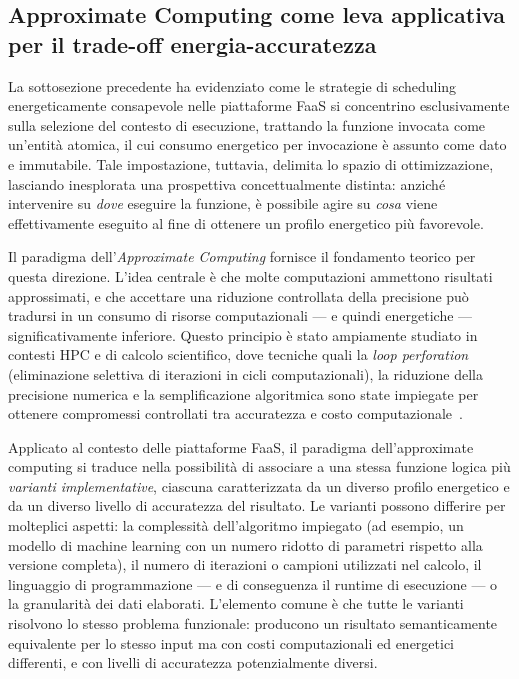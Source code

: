 \subsection{Approximate Computing come leva applicativa per il trade-off energia-accuratezza}
\label{subsec:approximate_computing}

La sottosezione precedente ha evidenziato come le strategie di scheduling 
energeticamente consapevole nelle piattaforme FaaS si concentrino 
esclusivamente sulla selezione del contesto di esecuzione, 
trattando la funzione invocata come un’entità atomica,
il cui consumo energetico per invocazione è assunto come dato e 
immutabile. Tale impostazione, tuttavia, delimita lo spazio 
di ottimizzazione, lasciando inesplorata una prospettiva 
concettualmente distinta: anziché intervenire su \emph{dove} 
eseguire la funzione, è possibile agire su \emph{cosa} viene 
effettivamente eseguito al fine di ottenere un profilo energetico 
più favorevole.

Il paradigma dell'\emph{Approximate Computing} fornisce il fondamento
teorico per questa direzione. L'idea centrale è che molte computazioni ammettono risultati
approssimati, e che accettare una riduzione controllata della precisione
può tradursi in un consumo di risorse computazionali --- e quindi
energetiche --- significativamente inferiore. Questo principio è stato ampiamente
studiato in contesti HPC e di calcolo scientifico, dove tecniche
quali la \emph{loop perforation} (eliminazione selettiva di iterazioni
in cicli computazionali), la riduzione della precisione numerica e la
semplificazione algoritmica sono state impiegate per ottenere
compromessi controllati tra accuratezza e costo
computazionale~\cite{mittal2016survey}.

Applicato al contesto delle piattaforme FaaS, il paradigma
dell'approximate computing si traduce nella possibilità di associare a
una stessa funzione logica più \emph{varianti implementative},
ciascuna caratterizzata da un diverso profilo energetico e da un diverso
livello di accuratezza del risultato. Le varianti possono differire per
molteplici aspetti: la complessità dell'algoritmo impiegato (ad esempio,
un modello di machine learning con un numero ridotto di parametri
rispetto alla versione completa), il numero di iterazioni o campioni
utilizzati nel calcolo, il linguaggio di programmazione --- e di conseguenza il runtime di
esecuzione --- o la granularità dei dati elaborati. L'elemento comune è che
tutte le varianti risolvono lo stesso problema funzionale: producono
un risultato semanticamente equivalente per lo stesso input ma con
costi computazionali ed energetici differenti, e con livelli di
accuratezza potenzialmente diversi.

